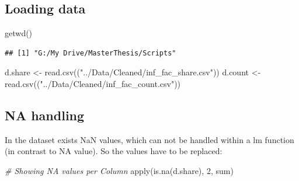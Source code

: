 \documentclass[
]{article}
\newenvironment{Shaded}{\begin{snugshade}}{\end{snugshade}}
\newcommand{\CommentTok}[1]{\textcolor[rgb]{0.56,0.35,0.01}{\textit{#1}}}
\newcommand{\DecValTok}[1]{\textcolor[rgb]{0.00,0.00,0.81}{#1}}
\newcommand{\FunctionTok}[1]{\textcolor[rgb]{0.00,0.00,0.00}{#1}}
\newcommand{\NormalTok}[1]{#1}
\newcommand{\OtherTok}[1]{\textcolor[rgb]{0.56,0.35,0.01}{#1}}
\newcommand{\StringTok}[1]{\textcolor[rgb]{0.31,0.60,0.02}{#1}}
\begin{document}
\hypertarget{loading-data}{%
\subsection{Loading data}\label{loading-data}}

\begin{Shaded}
\begin{Highlighting}[]
\FunctionTok{getwd}\NormalTok{()}
\end{Highlighting}
\end{Shaded}

\begin{verbatim}
## [1] "G:/My Drive/MasterThesis/Scripts"
\end{verbatim}

\begin{Shaded}
\begin{Highlighting}[]
\NormalTok{d.share }\OtherTok{\textless{}{-}} \FunctionTok{read.csv}\NormalTok{((}\StringTok{"../Data/Cleaned/inf\_fac\_share.csv"}\NormalTok{))}
\NormalTok{d.count }\OtherTok{\textless{}{-}} \FunctionTok{read.csv}\NormalTok{((}\StringTok{"../Data/Cleaned/inf\_fac\_count.csv"}\NormalTok{)) }
\end{Highlighting}
\end{Shaded}

\hypertarget{na-handling}{%
\subsection{NA handling}\label{na-handling}}

In the dataset exists NaN values, which can not be handled within a lm
function (in contrast to NA value). So the values have to be replaced:

\begin{Shaded}
\begin{Highlighting}[]
\CommentTok{\# Showing NA values per Column}
\FunctionTok{apply}\NormalTok{(}\FunctionTok{is.na}\NormalTok{(d.share), }\DecValTok{2}\NormalTok{, sum)}
\end{Highlighting}
\end{Shaded}
\end{document}

